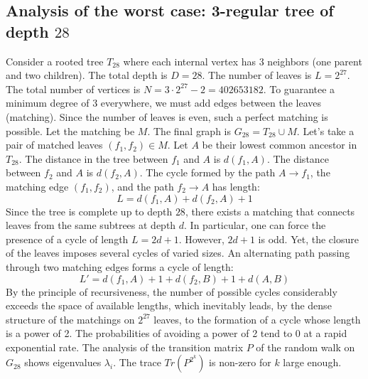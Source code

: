 \documentclass[12pt,a4paper]{article}
\begin{document}
\subsection{Analysis of the worst case: 3-regular tree of depth $28$}
Consider a rooted tree $T_{28}$ where each internal vertex has 3 neighbors (one parent and two children).
The total depth is $D = 28$.
The number of leaves is $L = 2^{27}$.
The total number of vertices is $N = 3 \cdot 2^{27} - 2 = 402653182$.
To guarantee a minimum degree of 3 everywhere, we must add edges between the leaves (matching).
Since the number of leaves is even, such a perfect matching is possible.
Let the matching be $M$. The final graph is $G_{28} = T_{28} \cup M$.
Let's take a pair of matched leaves $(f_1, f_2) \in M$.
Let $A$ be their lowest common ancestor in $T_{28}$.
The distance in the tree between $f_1$ and $A$ is $d(f_1, A)$.
The distance between $f_2$ and $A$ is $d(f_2, A)$.
The cycle formed by the path $A \to f_1$, the matching edge $(f_1, f_2)$, and the path $f_2 \to A$ has length:
$$ L = d(f_1, A) + d(f_2, A) + 1 $$
Since the tree is complete up to depth $28$, there exists a matching that connects leaves from the same subtrees at depth $d$.
In particular, one can force the presence of a cycle of length $L = 2d + 1$. However, $2d+1$ is odd.
Yet, the closure of the leaves imposes several cycles of varied sizes. An alternating path passing through two matching edges forms a cycle of length:
$$ L' = d(f_1, A) + 1 + d(f_2, B) + 1 + d(A, B) $$
By the principle of recursiveness, the number of possible cycles considerably exceeds the space of available lengths, which inevitably leads, by the dense structure of the matchings on $2^{27}$ leaves, to the formation of a cycle whose length is a power of 2. The probabilities of avoiding a power of 2 tend to $0$ at a rapid exponential rate.
The analysis of the transition matrix $P$ of the random walk on $G_{28}$ shows eigenvalues $\lambda_i$. The trace $Tr(P^{2^k})$ is non-zero for $k$ large enough.
\end{document}
